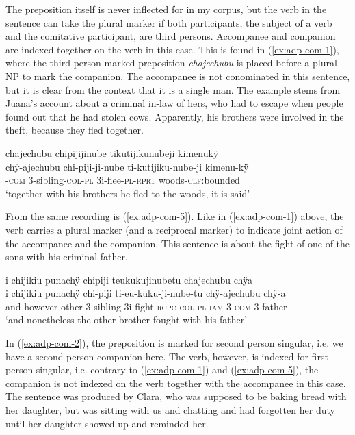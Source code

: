The preposition itself is never inflected for  in my corpus, but the verb in the sentence can take the plural marker if both participants, the subject of a verb and the comitative participant, are third persons. Accompanee and companion are indexed together on the verb in this case. This is found in (\ref{ex:adp-com-1}), where the third-person marked preposition \textit{chajechubu} is placed before a plural NP to mark the companion. The accompanee is not conominated in this sentence, but it is clear from the context that it is a single man. The example stems from Juana’s account about a criminal in-law of hers, who had to escape when people found out that he had stolen cows. Apparently, his brothers were involved in the theft, because they fled together.

\ea\label{ex:adp-com-1}
\begingl
\glpreamble chajechubu chipijijinube tikutijikunubeji kimenukÿ \\
\gla chÿ-ajechubu chi-piji-ji-nube ti-kutijiku-nube-ji kimenu-kÿ \\
-\textsc{com} 3-sibling-\textsc{col}-\textsc{pl} 3i-flee-\textsc{pl}-\textsc{rprt} woods-\textsc{clf:}bounded\\
\glft ‘together with his brothers he fled to the woods, it is said’
\endgl
\trailingcitation{[jxx-p120430l-2.087]}
\xe

From the same recording is (\ref{ex:adp-com-5}). Like in (\ref{ex:adp-com-1}) above, the verb carries a plural marker (and a reciprocal marker) to indicate joint action of the accompanee and the companion. This sentence is about the fight of one of the sons with his criminal father.

\newpage
\ea\label{ex:adp-com-5}
\begingl
\glpreamble i chijikiu punachÿ chipiji teukukujinubetu chajechubu chÿa\\
\gla i chijikiu punachÿ chi-piji ti-eu-kuku-ji-nube-tu chÿ-ajechubu chÿ-a\\
\glb and however other 3-sibling 3i-fight-\textsc{rcpc}-\textsc{col}-\textsc{pl}-\textsc{iam} 3-\textsc{com} 3-father\\
\glft ‘and nonetheless the other brother fought with his father’
\endgl
\trailingcitation{[jxx-p120430l-2.196]}
\xe

In (\ref{ex:adp-com-2}), the preposition is marked for second person singular, i.e. we have a second person companion here. The verb, however, is indexed for first person singular, i.e. contrary to (\ref{ex:adp-com-1}) and (\ref{ex:adp-com-5}), the companion is not indexed on the verb together with the accompanee in this case. The sentence was produced by Clara, who was supposed to be baking bread with her daughter, but was sitting with us and chatting and had forgotten her duty until her daughter showed up and reminded her.

